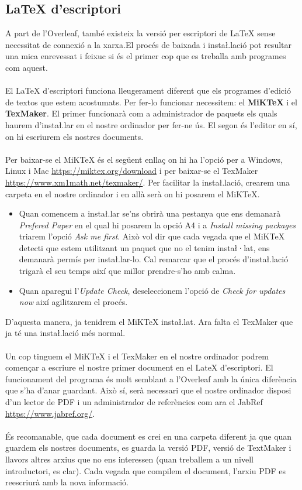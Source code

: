 \documentclass[12pm,oneside,onecolumn,openany]{book}
\begin{document}
\subsection{LaTeX d'escriptori}
A part de l'Overleaf, també existeix la versió per escriptori de LaTeX sense necessitat de connexió a la xarxa.El procés de baixada i insta\l.lació pot resultar una mica enrevessat i feixuc si és el primer cop que es treballa amb programes com aquest.\\\\
El LaTeX d'escriptori funciona lleugerament diferent que els programes d'edició de textos que estem acostumats. Per fer-lo funcionar necessitem: el \textbf{MiKTeX} i el \textbf{TexMaker}. 
El primer funcionarà com a administrador de paquets els quals haurem d'insta\l.lar en el nostre ordinador per fer-ne ús. El segon és l'editor en sí, on hi escriurem els nostres documents.\\\\
Per baixar-se el MiKTeX és el següent enllaç on hi ha l'opció per a Windows, Linux i Mac \url{https://miktex.org/download} i per baixar-se el TexMaker \url{https://www.xm1math.net/texmaker/}. Per facilitar la insta\l.lació, crearem una carpeta en el nostre ordinador i en allà serà on hi posarem el MiKTeX.
\begin{itemize}
    \item Quan comencem a insta\l.lar se'ns obrirà una pestanya que ens demanarà \textit{Prefered Paper} en el qual hi posarem la opció A4 i a \textit{Install missing packages} triarem l'opció \textit{Ask me first}. Això vol dir que cada vegada que el MiKTeX detecti que estem utilitzant un paquet que no el tenim insta\l·lat, ens demanarà permís per insta\l.lar-lo. Cal remarcar que el procés d'insta\l.lació trigarà el seu temps així que millor prendre-s'ho amb calma.
    \item Quan aparegui l'\textit{Update Check}, deseleccionem l'opció de \textit{Check for updates now} així agilitzarem el procés. 
\end{itemize}
D'aquesta manera, ja tenidrem el MiKTeX insta\l.lat. Ara falta el TexMaker que ja té una insta\l.lació més normal.\\\\
Un cop tinguem el MiKTeX i el TexMaker en el nostre ordinador podrem començar a escriure el nostre primer document en el LateX d'escriptori. El funcionament del programa
és molt semblant a l'Overleaf amb la única diferència que s'ha d'anar guardant. Això sí, serà necessari que el nostre ordinador disposi d'un lector de PDF i un administrador de referències com ara el JabRef \url{https://www.jabref.org/}.\\\\
És recomanable, que cada document es crei en una carpeta diferent ja que quan guardem els nostres documents, es guarda la versió PDF, versió de TextMaker i llavors altres arxius que no ens interessen (quan treballem a un nivell introductori, es clar). Cada vegada que compilem el document, l'arxiu PDF es reescriurà amb la nova informació.
\end{document}

